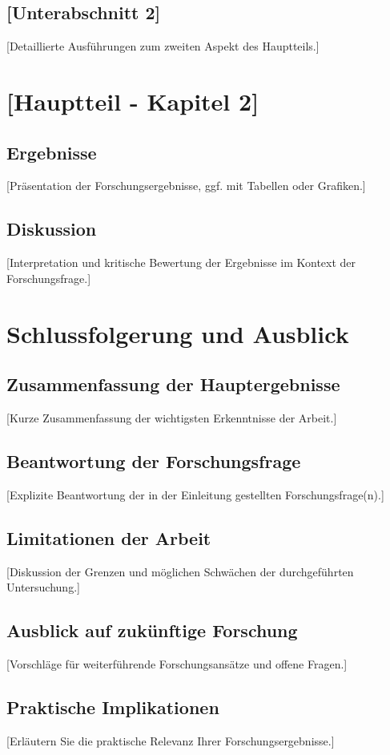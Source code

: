 \documentclass[a4paper,12pt]{article}
\begin{document}
\subsection{[Unterabschnitt 2]}
[Detaillierte Ausführungen zum zweiten Aspekt des Hauptteils.]

\section{[Hauptteil - Kapitel 2]}
\subsection{Ergebnisse}
[Präsentation der Forschungsergebnisse, ggf. mit Tabellen oder Grafiken.]

\subsection{Diskussion}
[Interpretation und kritische Bewertung der Ergebnisse im Kontext der Forschungsfrage.]

\section{Schlussfolgerung und Ausblick}
\subsection{Zusammenfassung der Hauptergebnisse}
[Kurze Zusammenfassung der wichtigsten Erkenntnisse der Arbeit.]

\subsection{Beantwortung der Forschungsfrage}
[Explizite Beantwortung der in der Einleitung gestellten Forschungsfrage(n).]

\subsection{Limitationen der Arbeit}
[Diskussion der Grenzen und möglichen Schwächen der durchgeführten Untersuchung.]

\subsection{Ausblick auf zukünftige Forschung}
[Vorschläge für weiterführende Forschungsansätze und offene Fragen.]

\subsection{Praktische Implikationen}
[Erläutern Sie die praktische Relevanz Ihrer Forschungsergebnisse.]
\end{document}

